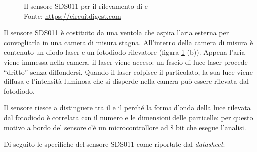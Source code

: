 \begin{figure}[H]%
    \centering
    \captionsetup{justification=centering}
    \caption{Il sensore SDS011 per il rilevamento di  e \\Fonte: \url{https://circuitdigest.com}}%
    \label{fig:mics}%
\end{figure}

Il sensore SDS011 è costituito da una ventola che aspira l’aria esterna per convogliarla in una camera di misura stagna. All’interno della camera di misura è contenuto un diodo laser e un fotodiodo rilevatore (figura \ref{fig:mics} (b)). Appena l’aria viene immessa nella camera, il laser viene acceso: un fascio di luce laser procede “dritto” senza diffondersi. Quando il laser colpisce il particolato, la sua luce viene diffusa e l’intensità luminosa che si disperde nella camera può essere rilevata dal fotodiodo. 

Il sensore riesce a distinguere tra il  e il  perché la forma d’onda della luce rilevata dal fotodiodo è correlata con il numero e le dimensioni delle particelle: per questo motivo a bordo del sensore c’è un microcontrollore ad 8 bit che esegue l’analisi. \cite{sds}

Di seguito le specifiche del sensore SDS011 come riportate dal \textit{datasheet}:

